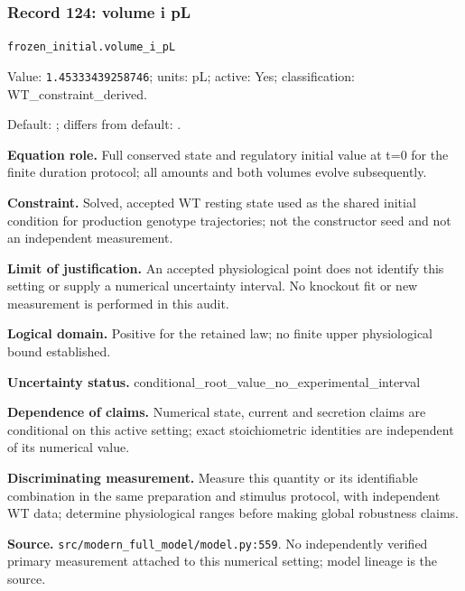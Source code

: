 \subsubsection*{Record 124: volume i pL}
{\small \nolinkurl{frozen_initial.volume_i_pL}\par

Value: \texttt{1.45333439258746}; units: pL; active: Yes; classification: WT\_constraint\_derived.\par

Default: ; differs from default: .\par

\textbf{Equation role.} Full conserved state and regulatory initial value at t=0 for the finite duration protocol; all amounts and both volumes evolve subsequently.\par

\textbf{Constraint.} Solved, accepted WT resting state used as the shared initial condition for production genotype trajectories; not the constructor seed and not an independent measurement.\par

\textbf{Limit of justification.} An accepted physiological point does not identify this setting or supply a numerical uncertainty interval. No knockout fit or new measurement is performed in this audit.\par

\textbf{Logical domain.} Positive for the retained law; no finite upper physiological bound established.\par

\textbf{Uncertainty status.} conditional\_root\_value\_no\_experimental\_interval\par

\textbf{Dependence of claims.} Numerical state, current and secretion claims are conditional on this active setting; exact stoichiometric identities are independent of its numerical value.\par

\textbf{Discriminating measurement.} Measure this quantity or its identifiable combination in the same preparation and stimulus protocol, with independent WT data; determine physiological ranges before making global robustness claims.\par

\textbf{Source.} \nolinkurl{src/modern_full_model/model.py:559}. No independently verified primary measurement attached to this numerical setting; model lineage is the source.\par}

